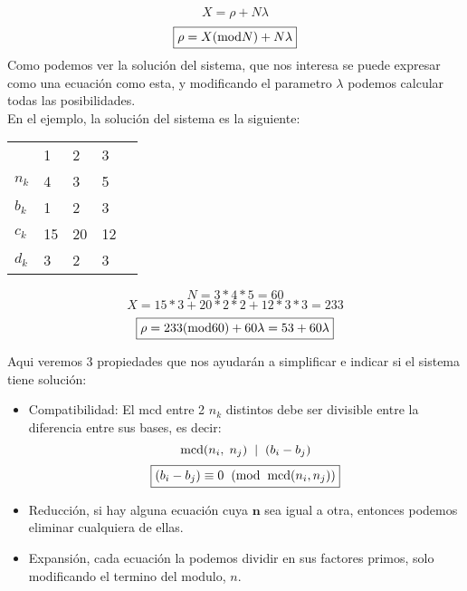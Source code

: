 \[
        \boxed{X = \rho + N \lambda}
\]
\[
        \boxed{\rho = X(\textnormal{mod}N) + N\lambda}
\]
 Como podemos ver la solución del sistema, que nos interesa se puede expresar como una ecuación como esta, y modificando el parametro \(\lambda\) podemos calcular todas las posibilidades.\\ En el ejemplo, la solución del sistema es la siguiente:
\begin{table}[h]
        \begin{tabular}{lllll}
                \multicolumn{1}{l|}{}        & \multicolumn{1}{l|}{1}  & \multicolumn{1}{l|}{2}  & \multicolumn{1}{l|}{3}  & \\ \cline{1-4}
                \multicolumn{1}{l|}{\(n_k\)} & \multicolumn{1}{l|}{4}  & \multicolumn{1}{l|}{3}  & \multicolumn{1}{l|}{5}  & \\ \cline{1-4}
                \multicolumn{1}{l|}{\(b_k\)} & \multicolumn{1}{l|}{1}  & \multicolumn{1}{l|}{2}  & \multicolumn{1}{l|}{3}  & \\ \cline{1-4}
                \multicolumn{1}{l|}{\(c_k\)} & \multicolumn{1}{l|}{15} & \multicolumn{1}{l|}{20} & \multicolumn{1}{l|}{12} & \\ \cline{1-4}
                \multicolumn{1}{l|}{\(d_k\)} & \multicolumn{1}{l|}{3}  & \multicolumn{1}{l|}{2}  & \multicolumn{1}{l|}{3}  & \\
        \end{tabular}
\end{table}
\[
        N = 3*4*5 = 60
\]
\[
        X = 15*3+ 20*2*2+12*3*3=233
\]
\[
        \boxed{\rho = 233(\textnormal{mod}60) + 60\lambda = 53 + 60\lambda}
\]
 \par
 Aqui veremos 3 propiedades que nos ayudarán a simplificar e indicar si el sistema tiene solución:
\begin{itemize}
        \item Compatibilidad: El mcd entre 2 \(n_k\) distintos debe ser divisible entre la diferencia entre sus bases, es decir:
              \[
                      \textnormal{mcd}(n_i,\hspace{1mm}n_j) \hspace{2mm}| \hspace{2mm} (b_i-b_j)
              \]
              \[
                      \boxed{(b_i - b_j) \equiv 0 \hspace{2mm}(\textnormal{mod}\hspace{2mm}\textnormal{mcd}(n_i,n_j))}
              \]
        \item Reducción, si hay alguna ecuación cuya \(\mathbf{n}\) sea igual a otra, entonces podemos eliminar cualquiera de ellas.
        \item Expansión, cada ecuación la podemos dividir en sus factores primos, solo modificando el termino del modulo, \(n\).
\end{itemize}
